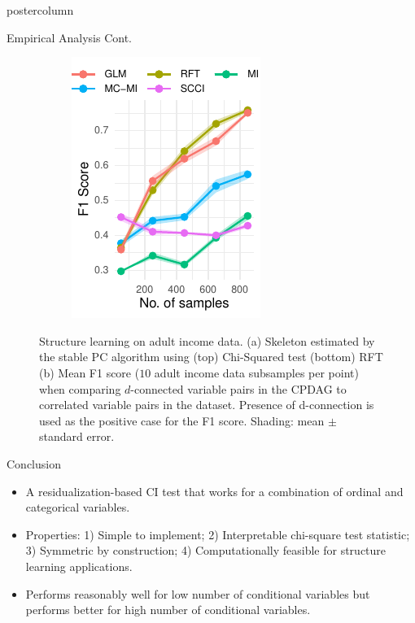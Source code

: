 \documentclass{beamer}
\begin{document}
\begin{frame}
\begin{columns}
\begin{column}{0.33\textwidth}
\begin{beamercolorbox}[center]{postercolumn}
\begin{minipage}{.98\textwidth}
{\begin{myblock}{Empirical Analysis Cont.}
\begin{figure}
\begin{subfigure}[t]{0.55\textwidth}
				\caption{}
				\label{fig:sl_adult_model}
			\end{subfigure}%
			\begin{subfigure}[t]{0.4\textwidth}
				\includegraphics[scale=2.7]{../in_person/imgs/adult_F1.pdf}
				\caption{}
				\label{fig:sl_adult}
			\end{subfigure}
			\caption{Structure learning on adult income data. (a) Skeleton
				estimated by the stable PC algorithm using
				(top) Chi-Squared test (bottom) RFT (b) Mean F1
				score ($10$ adult income data subsamples per
				point) when comparing $d$-connected variable
				pairs in the CPDAG to correlated variable pairs
				in the dataset. Presence of d-connection is
				used as the positive case for the F1 score.
				Shading: mean $\pm$ standard error.}
		\end{figure}
	\end{myblock}\vfill
	\begin{myblock}{Conclusion}
		\begin{itemize}
			\item \justifying A residualization-based CI test that works for a
				combination of ordinal and categorical
				variables.
			\item \justifying Properties: 1) Simple to implement; 2)
				Interpretable chi-square test statistic; 3)
				Symmetric by construction; 4) Computationally
				feasible for structure learning applications.
			\item \justifying Performs reasonably well for low number of
				conditional variables but performs better for
				high number of conditional variables.

\end{itemize}
\end{myblock}}
\end{minipage}
\end{beamercolorbox}
\end{column}
\end{columns}
\end{frame}
\end{document}

